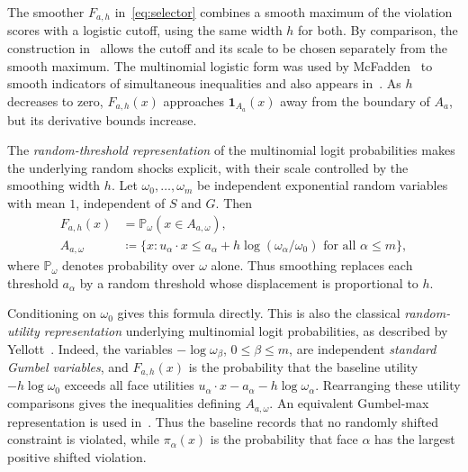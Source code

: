 \documentclass[11pt,letterpaper]{article}
\theoremstyle{remark}
\newcommand{\Pp}{\mathbb P}
\newcommand{\ind}{\mathbf 1}
\begin{document}
{
The smoother \(F_{a,h}\) in~\eqref{eq:selector} combines a smooth
maximum of the violation scores with a logistic cutoff, using the
same width \(h\) for both. By comparison,
the construction in~\cite{CCK2013} allows the cutoff and its scale to
be chosen separately from the smooth maximum. The multinomial
logistic form was used by McFadden~\cite[p.~1001]{McFadden1989} to
smooth indicators of simultaneous inequalities and also appears
in~\cite[eq.~(5)]{GaoZhang}. As \(h\) decreases to zero,
\(F_{a,h}(x)\) approaches \(\ind_{A_a}(x)\) away from the boundary
of \(A_a\), but its derivative bounds increase.
}

{The \emph{random-threshold representation} of the multinomial logit
probabilities makes the underlying random shocks explicit, with their
scale controlled by the smoothing width \(h\).} Let \(\omega_0,\ldots,\omega_m\) be independent
exponential random variables with mean \(1\), independent of \(S\) and
\(G\). Then
\begin{equation}
 \begin{split}
 F_{a,h}(x)&=\Pp_\omega(x\in A_{a,\omega}),\\
 A_{a,\omega}&\coloneqq\{x:u_\alpha\cdot x\le
 a_\alpha+h\log(\omega_\alpha/\omega_0)
                   \text{ for all }\alpha\le m\},
 \end{split}
 \label{eq:mixture}
\end{equation}
where $\Pp_\omega$ denotes probability over $\omega$ alone. {Thus smoothing replaces each threshold \(a_\alpha\) by a random threshold whose displacement is proportional to \(h\).} 

Conditioning on \(\omega_0\) gives this formula directly. This is also
the classical \emph{random-utility representation} underlying
multinomial logit probabilities, as described by
Yellott~\cite[Section~2.6]{Yellott1977}. Indeed, the variables
\(-\log\omega_\beta\), \(0\le\beta\le m\), are independent
\emph{standard Gumbel variables}, and \(F_{a,h}(x)\) is the probability
that the baseline utility \(-h\log\omega_0\) exceeds all face utilities
\(u_\alpha\cdot x-a_\alpha-h\log\omega_\alpha\).
Rearranging these utility comparisons gives the inequalities defining
\(A_{a,\omega}\). {An equivalent Gumbel-max
representation is used in~\cite[Lemma~14]{GaoZhang}.}
{
Thus the baseline records that no randomly shifted constraint is
violated, while \(\pi_\alpha(x)\) is the probability that face
\(\alpha\) has the largest positive shifted violation.
}
\end{document}
